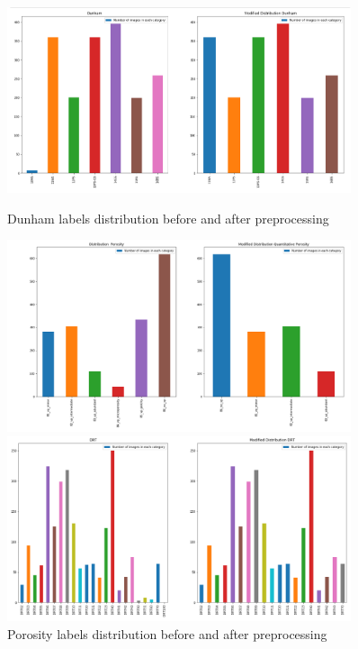 \begin{figure}
    \centering
    \begin{minipage}{0.45\textwidth}
        \centering
        \includegraphics[width=0.9\textwidth]{figures/03-Dunham.PNG} %
        \caption{Dunham labels distribution before and after preprocessing}\label{fig:cdunham}
    \end{minipage}\hfill
    \begin{minipage}{0.45\textwidth}
        \centering
        \includegraphics[width=0.9\textwidth]{figures/03-porosity_baby.PNG} %
        \caption{Porosity labels distribution before and after preprocessing}\label{fig:poro}
    \end{minipage}
    \begin{minipage}{0.45\textwidth}
        \centering
        \includegraphics[width=0.9\textwidth]{figures/03-DRT.PNG} %

\end{minipage}
\end{figure}
